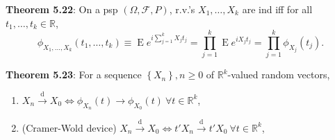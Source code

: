 \documentclass[paper=letter,fontsize=3mm]{scrartcl}
\DeclareMathOperator{\E}{E}
\newcommand{\convdist}{\stackrel{\text{d}}{\longrightarrow}}
\newcommand{\R}{\mathbb{R}}
\newcommand\set[1]{\left\{ #1 \right\}}
\begin{document}
\begin{multicols*}{3}
\textbf{Theorem 5.22}: On a psp $(\Omega, \mathcal{F}, P)$, r.v.'s $X_1, \dots, X_k$ are ind iff for all $t_1, \dots, t_k \in \R$,
$$\phi_{X_1, \dots, X_k}(t_1, \dots, t_k) \equiv \E e^{i\sum_{j=1}^k X_j t_j} =
\prod_{j=1}^k \E e^{iX_j t_j} = \prod_{j=1}^k \phi_{X_j}(t_j).$$


\textbf{Theorem 5.23}: For a sequence $\set{X_n}, n \ge 0$ of $\R^k$-valued random vectors,
\begin{enumerate}
\item $X_n \convdist X_0 \iff \phi_{X_n}(t) \to \phi_{X_0}(t) ~ \forall t \in \R^k$,
\item  (Cramer-Wold device) $X_n \convdist X_0 \iff t'X_n \convdist t' X_0 ~ \forall t \in \R^k$,
\end{enumerate}



























\end{multicols*}
\end{document}
